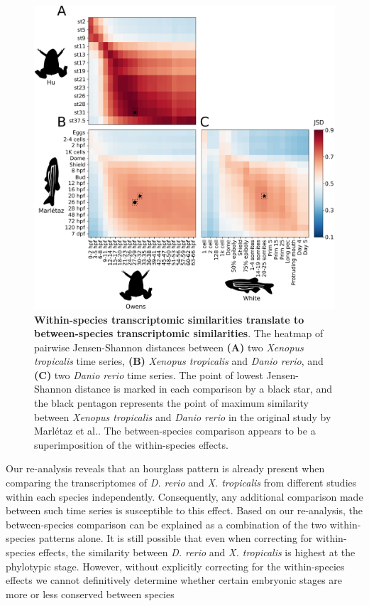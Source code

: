 \begin{figure}[H]
    \centering
    \includegraphics[width=0.8\linewidth]{ch.hourglass/images/between_experiment.png}
    \caption{\textbf{Within-species transcriptomic similarities translate to between-species transcriptomic similarities}. The heatmap of pairwise Jensen-Shannon distances between \textbf{(A)} two \textit{Xenopus tropicalis} time series, \textbf{(B)} \textit{Xenopus tropicalis} and \textit{Danio rerio}, and \textbf{(C)} two \textit{Danio rerio} time series. The point of lowest Jensen-Shannon distance is marked in each comparison by a black star, and the black pentagon represents the point of maximum similarity between \textit{Xenopus tropicalis} and \textit{Danio rerio} in the original study by Marl\'etaz et al.\cite{marletaz2018}. The between-species comparison appears to be a superimposition of the within-species effects.}
    \label{fig:betweenexperiment}
\end{figure}

Our re-analysis reveals that an hourglass pattern is already present when comparing the transcriptomes of \textit{D. rerio} and \textit{X. tropicalis} from different studies within each species independently. Consequently, any additional comparison made between such time series is susceptible to this effect. Based on our re-analysis, the between-species comparison can be explained as a combination of the two within-species patterns alone. It is still possible that even when correcting for within-species effects, the similarity between \textit{D. rerio} and \textit{X. tropicalis}  is highest at the phylotypic stage. However, without explicitly correcting for the within-species effects we cannot definitively determine whether certain embryonic stages are more or less conserved between species

